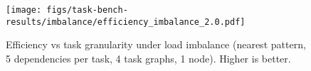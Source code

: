 \begin{figure}[t]

\centering
\texttt{[image: figs/task-bench-results/imbalance/efficiency\_imbalance\_2.0.pdf]}

\vspace{-0.15cm}
\caption{Efficiency vs task granularity under load imbalance (nearest pattern, 5 dependencies per task, 4 task graphs, 1 node). Higher is better.\label{fig:efficiency-imbalance}}
\vspace{-0.1cm}
\end{figure}
